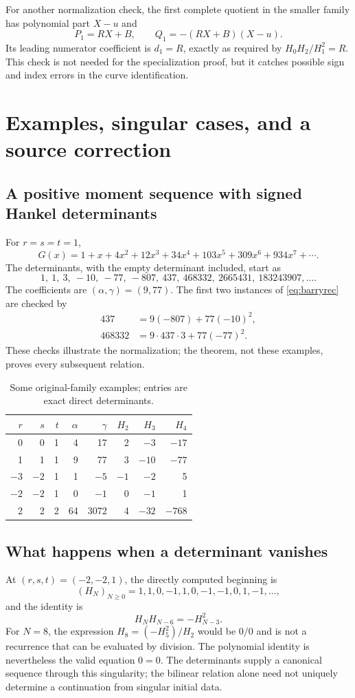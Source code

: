 \documentclass[11pt,a4paper]{article}
\numberwithin{equation}{section}
\theoremstyle{definition}
\begin{document}
For another normalization check, the first complete quotient in the smaller
family has polynomial part $X-u$ and
\[
 P_1=RX+B,\qquad Q_1=-(RX+B)(X-u).
\]
Its leading numerator coefficient is $d_1=R$, exactly as required by
$H_0H_2/H_1^2=R$. This check is not needed for the specialization proof, but
it catches possible sign and index errors in the curve identification.

\section{Examples, singular cases, and a source correction}

\subsection{A positive moment sequence with signed Hankel determinants}
For $r=s=t=1$,
\[
 G(x)=1+x+4x^2+12x^3+34x^4+103x^5+309x^6+934x^7+\cdots.
\]
The determinants, with the empty determinant included, start as
\[
 1,\ 1,\ 3,\ -10,\ -77,\ -807,\ 437,\ 468332,\ 2665431,\ 183243907,\ldots.
\]
The coefficients are $(\alpha,\gamma)=(9,77)$. The first two instances of
\eqref{eq:barryrec} are checked by
\begin{align*}
 437&=9(-807)+77(-10)^2,\\
 468332&=9\cdot437\cdot3+77(-77)^2.
\end{align*}
These checks illustrate the normalization; the theorem, not these examples,
proves every subsequent relation.

\begin{table}[htbp]
\centering\small
\caption{Some original-family examples; entries are exact direct determinants.}
\label{tab:examples}
\begin{tabular}{@{}rrrrrrrr@{}}
\toprule
$r$&$s$&$t$&$\alpha$&$\gamma$&$H_2$&$H_3$&$H_4$\\
\midrule
0&0&1&4&17&2&$-3$&$-17$\\
1&1&1&9&77&3&$-10$&$-77$\\
$-3$&$-2$&1&1&$-5$&$-1$&$-2$&5\\
$-2$&$-2$&1&0&$-1$&0&$-1$&1\\
2&2&2&64&3072&4&$-32$&$-768$\\
\bottomrule
\end{tabular}
\end{table}

\subsection{What happens when a determinant vanishes}
At $(r,s,t)=(-2,-2,1)$, the directly computed beginning is
\[
 (H_N)_{N\geq0}=1,1,0,-1,1,0,-1,-1,0,1,-1,\ldots,
\]
and the identity is
\[
 H_NH_{N-6}=-H_{N-3}^2.
\]
For $N=8$, the expression $H_8=(-H_5^2)/H_2$ would be $0/0$ and is not a
recurrence that can be evaluated by division. The polynomial identity is
nevertheless the valid equation $0=0$. The determinants supply a canonical
sequence through this singularity; the bilinear relation alone need not
uniquely determine a continuation from singular initial data.
\end{document}
